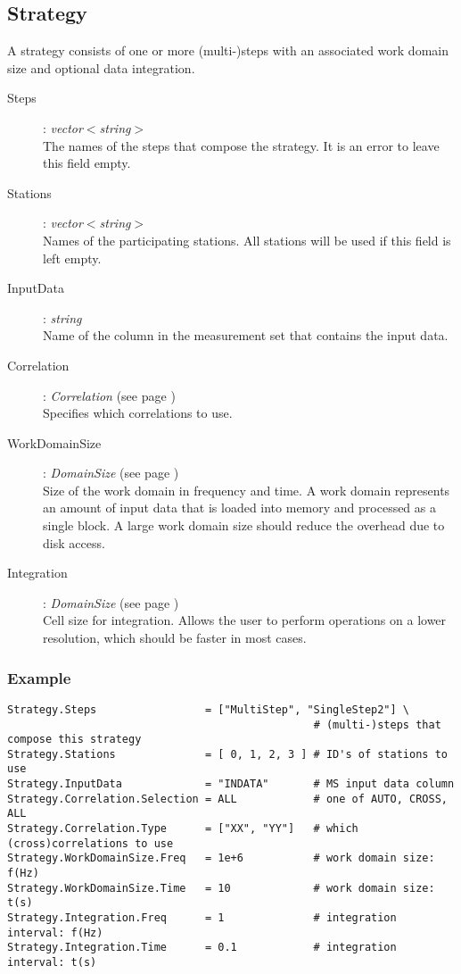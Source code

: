 \documentclass[10pt]{lofar}
\begin{document}
\subsection*{Strategy}
A strategy consists of one or more (multi-)steps with an associated work domain size and optional data integration.
\begin{description}
\item [Steps] : \emph{vector$<$string$>$} \\
    The names of the steps that compose the strategy. It is an error to leave this field empty. 
\item [Stations] : \emph{vector$<$string$>$} \\
    Names of the participating stations. All stations will be used if this field is left empty. 
\item [InputData] : \emph{string} \\
    Name of the column in the measurement set that contains the input data. 
\item [Correlation] : \emph{Correlation} (see page \pageref{app-correlation}) \\
    Specifies which correlations to use. 
\item [WorkDomainSize] : \emph{DomainSize} (see page \pageref{app-domainsize}) \\
    Size of the work domain in frequency and time. A work domain represents an amount of input data that is loaded into memory and processed as a single block. A large work domain size should reduce the overhead due to disk access. 
\item [Integration] : \emph{DomainSize} (see page \pageref{app-domainsize}) \\
    Cell size for integration. Allows the user to perform operations on a lower resolution, which should be faster in most cases. 
\end{description}

\subsubsection*{Example}
{\footnotesize
\begin{verbatim}
Strategy.Steps                 = ["MultiStep", "SingleStep2"] \
                                                # (multi-)steps that compose this strategy
Strategy.Stations              = [ 0, 1, 2, 3 ] # ID's of stations to use
Strategy.InputData             = "INDATA"       # MS input data column
Strategy.Correlation.Selection = ALL            # one of AUTO, CROSS, ALL
Strategy.Correlation.Type      = ["XX", "YY"]   # which (cross)correlations to use
Strategy.WorkDomainSize.Freq   = 1e+6           # work domain size: f(Hz)
Strategy.WorkDomainSize.Time   = 10             # work domain size: t(s)
Strategy.Integration.Freq      = 1              # integration interval: f(Hz)
Strategy.Integration.Time      = 0.1            # integration interval: t(s)
\end{verbatim}
}
\end{document}

